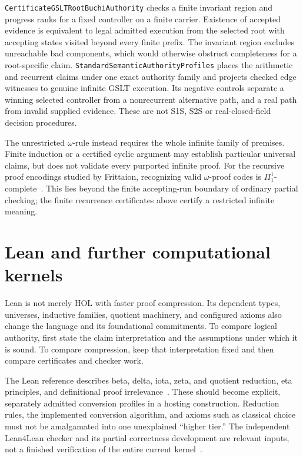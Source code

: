 \documentclass[11pt]{article}
\newcommand{\code}[1]{\nolinkurl{#1}}
\begin{document}
\code{CertificateGSLTRootBuchiAuthority} checks a finite invariant region
and progress ranks for a fixed controller on a finite carrier. Existence of
accepted evidence is equivalent to legal admitted execution from the
selected root with accepting states visited beyond every finite prefix.
The invariant region excludes unreachable bad components, which would
otherwise obstruct completeness for a root-specific claim.
\code{StandardSemanticAuthorityProfiles} places the arithmetic and recurrent
claims under one exact authority family and projects checked edge witnesses
to genuine infinite GSLT execution. Its negative controls separate a winning
selected controller from a nonrecurrent alternative path, and a real path
from invalid supplied evidence. These are not S1S, S2S or real-closed-field
decision procedures.

The unrestricted $\omega$-rule instead requires the whole infinite family
of premises. Finite induction or a certified cyclic argument may establish
particular universal claims, but does not validate every purported infinite
proof. For the recursive proof encodings studied by Frittaion, recognizing
valid $\omega$-proof codes is $\Pi^1_1$-complete~\cite{omegarule}. This lies
beyond the finite accepting-run boundary of ordinary partial checking; the
finite recurrence certificates above certify a restricted infinite meaning.

\section{Lean and further computational kernels}
Lean is not merely HOL with faster proof compression. Its dependent
types, universes, inductive families, quotient machinery, and configured
axioms also change the language and its foundational commitments. To
compare logical authority, first state the claim interpretation and the
assumptions under which it is sound. To compare compression, keep that
interpretation fixed and then compare certificates and checker work.

The Lean reference describes beta, delta, iota, zeta, and quotient
reduction, eta principles, and definitional proof irrelevance~\cite{leanref}.
These should become explicit, separately admitted conversion profiles in
a hosting construction. Reduction rules, the implemented conversion
algorithm, and axioms such as classical choice must not be amalgamated
into one unexplained ``higher tier.'' The independent Lean4Lean checker
and its partial correctness development are relevant inputs, not a
finished verification of the entire current kernel~\cite{lean4lean}.
\end{document}
